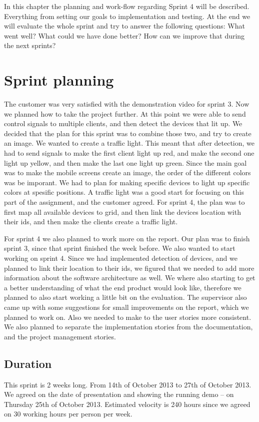 In this chapter the planning and work-flow regarding Sprint 4 will be described. 
Everything from setting our goals to implementation and testing. At the end we will evaluate the whole sprint and try to answer the following questions: What went well? What could we have done better? How can we improve that during the next sprints? 

\section{Sprint planning}

The customer was very satisfied with the demonstration video for sprint 3. Now we planned how to take the project further. At this point we were able to send control signals to multiple clients, and then detect the devices that lit up. We decided that the plan for this sprint was to combine those two, and try to create an image. We wanted to create a traffic light. This meant that after detection, we had to send signals to make the first client light up red, and make the second one light up yellow, and then make the last one light up green. Since the main goal was to make the mobile screens create an image, the order of the different colors was be imporant. We had to plan for making specific devices to light up specific colors at spesific positions. A traffic light was a good start for focusing on this part of the assignment, and the customer agreed. For sprint 4, the plan was to first map all available devices to grid, and then link the devices location with their ids, and then make the clients create a traffic light.  


For sprint 4 we also planned to work more on the report. Our plan was to finish sprint 3, since that sprint finished the week before. We also wanted to start working on sprint 4. Since we had implemented detection of devices, and we planned to link their location to their ids, we figured that we needed to add more information about the software architecture as well. We where also starting to get a better understanding of what the end product would look like, therefore we planned to also start working a little bit on the evaluation. The supervisor also came up with some suggestions for small improvements on the report, which we planned to work on. Also we needed to make to the user stories more consistent. We also planned to separate the implementation stories from the documentation, and the project management stories.

\subsection{Duration}
This sprint is 2 weeks long. From 14th of October 2013 to 27th of October 2013. We agreed
on the date of presentation and showing the running demo – on Thursday 25th of October 2013.
Estimated velocity is 240 hours since we agreed on 30 working hours per person per week.

